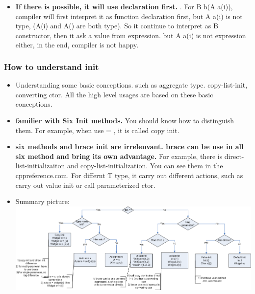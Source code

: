 \documentclass[a4paper,12pt,twoside]{book}
\begin{document}
\begin{itemize}
	\item \textbf{If there is possible, it will use declaration first. }. For B b(A a(i)), compiler will first interpret it as function declaration first, but A a(i) is not type, (A(i) and A() are both type). So it continue to interpret as B constructor, then it ask a value from expression. but A a(i) is not expression either, in the end, compiler is not happy. 
	
\end{itemize}

\subsubsection{How to understand init}
\begin{itemize}
	\item Understanding some basic conceptions. such as aggregate type. copy-list-init, converting ctor. All the high level usages are based on these basic conceptions. 
	
	\item \textbf{familier with Six Init methods.} You should know how to distinguish them. For example, when use = , it is called copy init. 
	
	\item \textbf{six methods and brace init are irrelenvant. brace can be use in all six method and bring its own advantage.} For example, there is direct-list-initializaiton and copy-list-initialization. You can see them in the cppreference.com. For differnt T type, it carry out different actions, such as carry out value init or call parameterized ctor.
	
	\item Summary picture: \\
	\includegraphics[scale=0.4]{pics/init.png}
\end{itemize}
\end{document}

